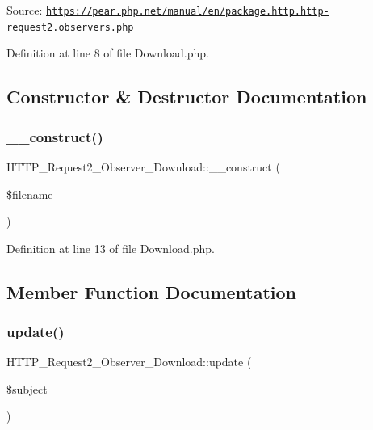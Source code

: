 Source\+: \href{https://pear.php.net/manual/en/package.http.http-request2.observers.php}{\tt https\+://pear.\+php.\+net/manual/en/package.\+http.\+http-\/request2.\+observers.\+php} 

Definition at line 8 of file Download.\+php.



\subsection{Constructor \& Destructor Documentation}
\mbox{\label{classHTTP__Request2__Observer__Download_a67e1f188f88776fa87dc69280ad41ea1}} 
\subsubsection{\texorpdfstring{\+\_\+\+\_\+construct()}{\_\_construct()}}
{\footnotesize\ttfamily H\+T\+T\+P\+\_\+\+Request2\+\_\+\+Observer\+\_\+\+Download\+::\+\_\+\+\_\+construct (\begin{DoxyParamCaption}\item[{}]{\$filename }\end{DoxyParamCaption})}



Definition at line 13 of file Download.\+php.



\subsection{Member Function Documentation}
\mbox{\label{classHTTP__Request2__Observer__Download_a5be07b74ddd29343e85fed87bef999eb}} 
\subsubsection{\texorpdfstring{update()}{update()}}
{\footnotesize\ttfamily H\+T\+T\+P\+\_\+\+Request2\+\_\+\+Observer\+\_\+\+Download\+::update (\begin{DoxyParamCaption}\item[{Spl\+Subject}]{\$subject }\end{DoxyParamCaption})}



